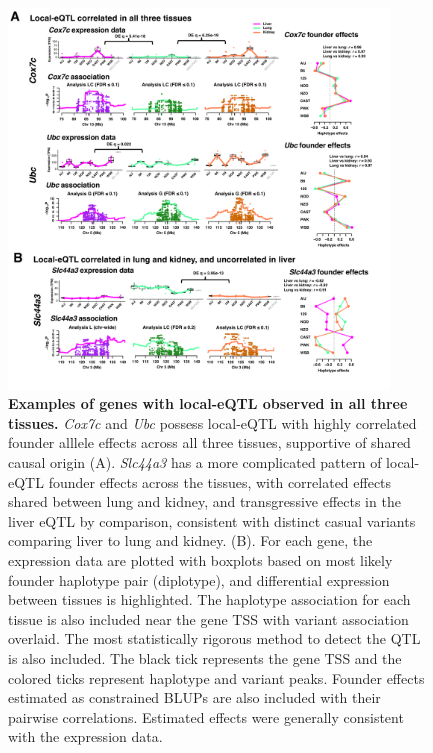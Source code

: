 \documentclass[9pt,twocolumn,twoside]{gsajnl}
\begin{document}
\begin{figure}[h!]
\renewcommand{\familydefault}{\sfdefault}\normalfont
\centering
\includegraphics[width=0.9\textwidth, trim={0in 0.5in 0in 0in}, clip]{figs/correlated_local_eqtl.pdf}
\caption{\textbf{Examples of genes with local-eQTL observed in all three tissues.} \textit{Cox7c} and \textit{Ubc} possess local-eQTL with highly correlated founder alllele effects across all three tissues, supportive of shared causal origin (A). \textit{Slc44a3} has a more complicated pattern of local-eQTL founder effects across the tissues, with correlated effects shared between lung and kidney, and transgressive effects in the liver eQTL by comparison, consistent with distinct casual variants comparing liver to lung and kidney. (B). For each gene, the expression data are plotted with boxplots based on most likely founder haplotype pair (diplotype), and differential expression between tissues is highlighted. The haplotype association for each tissue is also included near the gene TSS with variant association overlaid. The most statistically rigorous method to detect the QTL is also included. The black tick represents the gene TSS and the colored ticks represent haplotype and variant peaks. Founder effects estimated as constrained BLUPs are also included with their pairwise correlations. Estimated effects were generally consistent with the expression data.\label{fig:correlated_local_eqtl}}
\end{figure}
\end{document}
